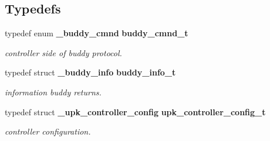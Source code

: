 \subsection*{Typedefs}
\begin{DoxyCompactItemize}
\item 
typedef enum {\bf \_\-buddy\_\-cmnd} {\bf buddy\_\-cmnd\_\-t}
\begin{DoxyCompactList}\small\item\em controller side of buddy protocol. \end{DoxyCompactList}\item 
typedef struct {\bf \_\-buddy\_\-info} {\bf buddy\_\-info\_\-t}
\begin{DoxyCompactList}\small\item\em information buddy returns. \end{DoxyCompactList}\item 
typedef struct {\bf \_\-upk\_\-controller\_\-config} {\bf upk\_\-controller\_\-config\_\-t}
\begin{DoxyCompactList}\small\item\em controller configuration. \end{DoxyCompactList}\end{DoxyCompactItemize}

